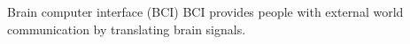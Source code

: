 \documentclass[aspectratio=169]{beamer}
\let\oldcite\cite %
\renewcommand{\cite}[1]{{\tiny\oldcite{#1}}}
\begin{document}
\begin{frame}{Brain computer interface (BCI)}
    \centering
    BCI provides people with external world communication by translating brain signals.~\cite{khan2020review}
    \begin{figure}[!ht]
        \centering
    \end{figure}

\end{frame}
\end{document}
